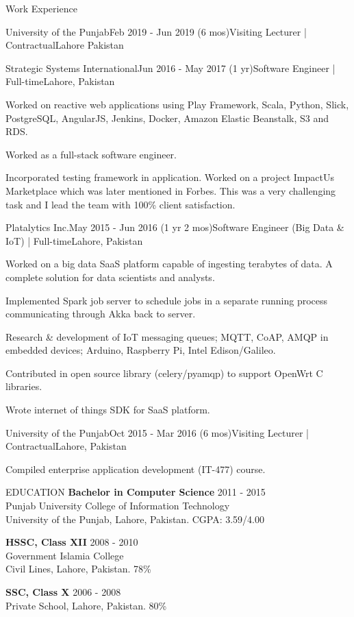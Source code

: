 \documentclass{resume}
\begin{document}
\begin{rSection}{Work Experience}
\begin{rSubsection}{University of the Punjab}{Feb 2019 - Jun 2019 (6 mos)}{Visiting Lecturer | Contractual}{Lahore Pakistan}
  \end{rSubsection}
  \begin{rSubsection}{Strategic Systems International}{Jun 2016 - May 2017 (1 yr)}{Software Engineer | Full-time}{Lahore, Pakistan}
    \item Worked on reactive web applications using Play Framework, Scala, Python, Slick, PostgreSQL, AngularJS, Jenkins, Docker, Amazon Elastic Beanstalk, S3 and RDS.
    \item Worked as a full-stack software engineer.
    \item Incorporated testing framework in application.
    \iten Worked on a project ImpactUs Marketplace which was later mentioned in Forbes. This was a very challenging task and I lead the team with 100\% client satisfaction.
  \end{rSubsection}
  \begin{rSubsection}{Platalytics Inc.}{May 2015 - Jun 2016 (1 yr 2 mos)}{Software Engineer (Big Data \& IoT) | Full-time}{Lahore, Pakistan}
    \item Worked on a big data SaaS platform capable of ingesting terabytes of data. A complete solution for data scientists and analysts.
    \item Implemented Spark job server to schedule jobs in a separate running process communicating through Akka back to server.
    \item Research \& development of IoT messaging queues; MQTT, CoAP, AMQP in embedded devices; Arduino, Raspberry Pi, Intel Edison/Galileo.
    \item Contributed in open source library (celery/pyamqp) to support OpenWrt C libraries.
    \item Wrote internet of things SDK for SaaS platform.
  \end{rSubsection}
  \begin{rSubsection}{University of the Punjab}{Oct 2015 - Mar 2016 (6 mos)}{Visiting Lecturer | Contractual}{Lahore, Pakistan}
    \item Compiled enterprise application development (IT-477) course.
  \end{rSubsection}
\end{rSection}
\begin{rSection}{EDUCATION}
  {\bf Bachelor in Computer Science} \hfill {2011 - 2015}
  \\
  Punjab University College of Information Technology
  \\
  University of the Punjab, Lahore, Pakistan. CGPA: 3.59/4.00

  {\bf HSSC, Class XII} \hfill {2008 - 2010}
  \\
  Government Islamia College
  \\
  Civil Lines, Lahore, Pakistan. 78\%

    {\bf SSC, Class X}  \hfill {2006 - 2008}
  \\
  Private School, Lahore, Pakistan. 80\%

\end{rSection}
\end{document}
